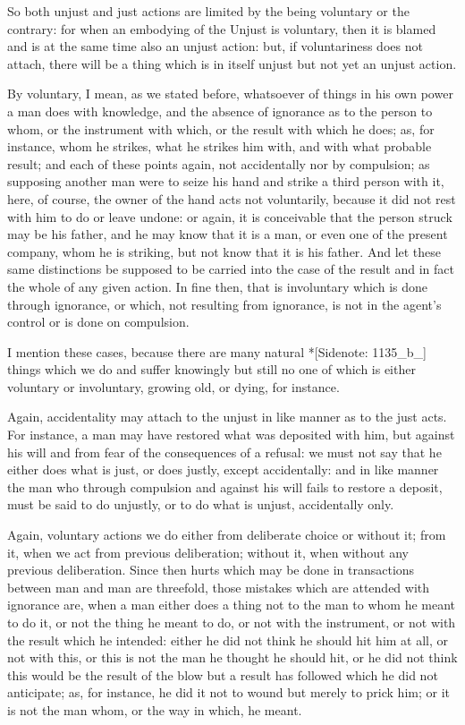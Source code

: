 So both unjust and just actions are limited by the being voluntary or
the contrary: for when an embodying of the Unjust is voluntary, then
it is blamed and is at the same time also an unjust action: but, if
voluntariness does not attach, there will be a thing which is in itself
unjust but not yet an unjust action.

By voluntary, I mean, as we stated before, whatsoever of things in his
own power a man does with knowledge, and the absence of ignorance as to
the person to whom, or the instrument with which, or the result with
which he does; as, for instance, whom he strikes, what he strikes him
with, and with what probable result; and each of these points again, not
accidentally nor by compulsion; as supposing another man were to seize
his hand and strike a third person with it, here, of course, the owner
of the hand acts not voluntarily, because it did not rest with him to do
or leave undone: or again, it is conceivable that the person struck may
be his father, and he may know that it is a man, or even one of the
present company, whom he is striking, but not know that it is his
father. And let these same distinctions be supposed to be carried into
the case of the result and in fact the whole of any given action. In
fine then, that is involuntary which is done through ignorance, or
which, not resulting from ignorance, is not in the agent's control or is
done on compulsion.

I mention these cases, because there are many natural *[Sidenote:
1135_b_] things which we do and suffer knowingly but still no one of
which is either voluntary or involuntary, growing old, or dying, for
instance.

Again, accidentality may attach to the unjust in like manner as to the
just acts. For instance, a man may have restored what was deposited
with him, but against his will and from fear of the consequences of
a refusal: we must not say that he either does what is just, or does
justly, except accidentally: and in like manner the man who through
compulsion and against his will fails to restore a deposit, must be said
to do unjustly, or to do what is unjust, accidentally only.

Again, voluntary actions we do either from deliberate choice or without
it; from it, when we act from previous deliberation; without it, when
without any previous deliberation. Since then hurts which may be done in
transactions between man and man are threefold, those mistakes which are
attended with ignorance are, when a man either does a thing not to the
man to whom he meant to do it, or not the thing he meant to do, or not
with the instrument, or not with the result which he intended: either he
did not think he should hit him at all, or not with this, or this is not
the man he thought he should hit, or he did not think this would be
the result of the blow but a result has followed which he did not
anticipate; as, for instance, he did it not to wound but merely to prick
him; or it is not the man whom, or the way in which, he meant.

